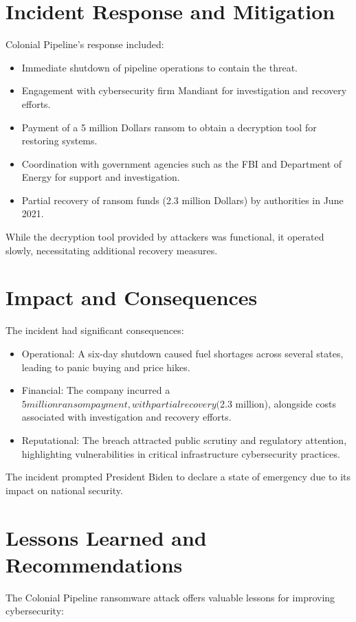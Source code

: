 \documentclass[11pt]{article}
\begin{document}
\section{Incident Response and Mitigation}
Colonial Pipeline's response included:
\begin{itemize}
    \item Immediate shutdown of pipeline operations to contain the threat.
    \item Engagement with cybersecurity firm Mandiant for investigation and recovery efforts.
    \item Payment of a 5 million Dollars ransom to obtain a decryption tool for restoring systems.
    \item Coordination with government agencies such as the FBI and Department of Energy for support and investigation.
    \item Partial recovery of ransom funds (2.3 million Dollars) by authorities in June 2021.
\end{itemize}

While the decryption tool provided by attackers was functional, it operated slowly, necessitating additional recovery measures.

\section{Impact and Consequences}
The incident had significant consequences:
\begin{itemize}
    \item Operational: A six-day shutdown caused fuel shortages across several states, leading to panic buying and price hikes.
    \item Financial: The company incurred a $5 million ransom payment, with partial recovery ($2.3 million), alongside costs associated with investigation and recovery efforts.
    \item Reputational: The breach attracted public scrutiny and regulatory attention, highlighting vulnerabilities in critical infrastructure cybersecurity practices.
\end{itemize}

The incident prompted President Biden to declare a state of emergency due to its impact on national security.

\section{Lessons Learned and Recommendations}
The Colonial Pipeline ransomware attack offers valuable lessons for improving cybersecurity:
\end{document}
